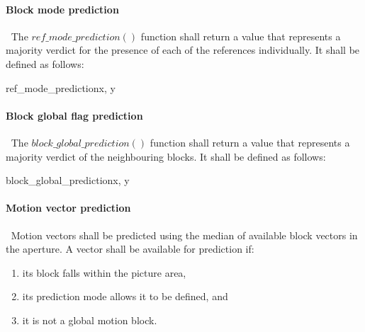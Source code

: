 \paragraph{Block mode prediction}
\label{modeprediction}
$\ $\newline
The $ref\_mode\_prediction()$ function shall return a value that represents a majority
 verdict for the presence of each of the references individually. It shall be defined
 as follows:

\begin{pseudo}{ref\_mode\_prediction}{x, y}
    \bsRET{\Intra}
    \bsRET{\BlockData[0][x-1][\RMode]}
    \bsRET{\BlockData[y-1][0][\RMode]}
\bsELSE
\bsEND
\end{pseudo}

\paragraph{Block global flag prediction}
\label{blockglobalprediction}
$\ $\newline
The $block\_global\_prediction()$ function shall return a value that represents a majority
 verdict of the neighbouring blocks. It shall be defined as follows:

\begin{pseudo}{block\_global\_prediction}{x, y}
    \bsRET{\false}
    \bsRET{\BlockData[0][x-1][\GMode]}
    \bsRET{\BlockData[y-1][0][\GMode]}
\bsELSE
\bsEND
\end{pseudo}

\paragraph{Motion vector prediction}
\label{mvprediction}
$\ $\newline
Motion vectors shall be predicted using the median of available block vectors 
in the aperture. A vector shall be available for prediction if:
\begin{enumerate}
\item its block falls within the picture area,
\item its prediction mode allows it to be defined, and
\item it is not a global motion block. 
\end{enumerate}

